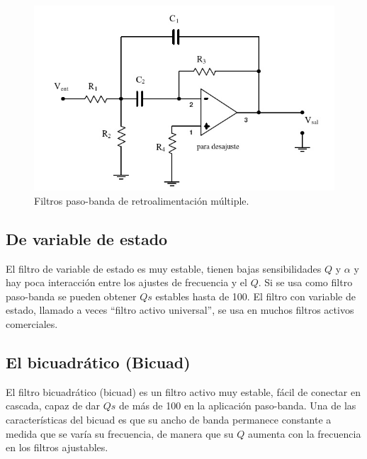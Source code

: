 \begin{figure}[H]
    \centering
    \includegraphics[width=0.5\linewidth]{Imagenes/Filtros de Retroalimentacion Multiple.png}
    \caption{Filtros paso-banda de retroalimentación múltiple.}
\end{figure}

\subsection{De variable de estado}
El filtro de variable de estado es muy estable, tienen bajas sensibilidades $Q$ y $\alpha$ y hay poca interacción entre los ajustes de frecuencia y el $Q$. Si se usa como filtro paso-banda se pueden obtener $Qs$ estables hasta de 100. El filtro con variable de estado, llamado a veces ``filtro activo universal'', se usa en muchos filtros activos comerciales.

\subsection{El bicuadrático (Bicuad)}
El filtro bicuadrático (bicuad) es un filtro activo muy estable, fácil de conectar en cascada, capaz de dar $Qs$ de más de 100 en la aplicación paso-banda. Una de las características del bicuad es que su ancho de banda permanece constante a medida que se varía su frecuencia, de manera que su $Q$ aumenta con la frecuencia en los filtros ajustables. 

